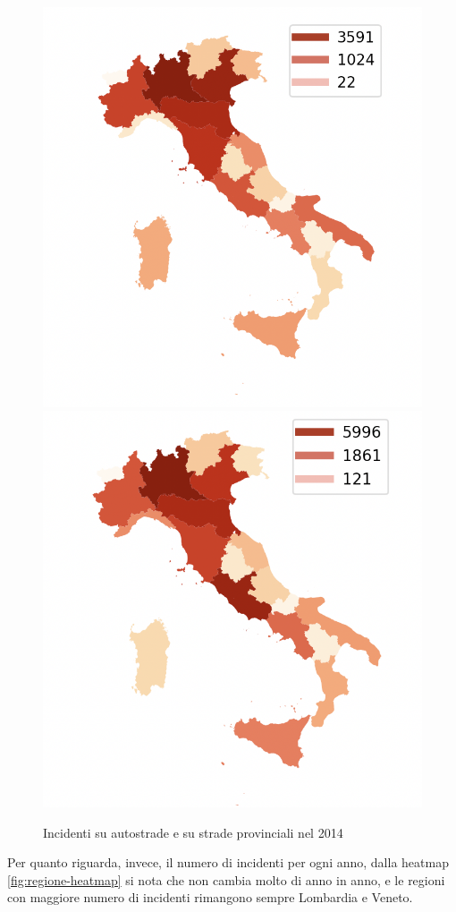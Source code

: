 \documentclass[a4paper]{report}
\begin{document}
\begin{figure}
    \includegraphics[width=0.5\linewidth]{../src/incidenti/incidenti_aci/mappe_regioni/incidenti_per_regione.png}
    \includegraphics[width=0.5\linewidth]{../src/incidenti/incidenti_aci/mappe_regioni/incidenti_regione_autostrade.png}
    \caption{Incidenti su autostrade e su strade provinciali nel 2014}
    \label{fig:incidenti-per-regione}
\end{figure}

Per quanto riguarda, invece, il numero di incidenti per ogni anno, 
dalla heatmap \ref{fig:regione-heatmap} 
si nota che non cambia molto di anno in anno, e le regioni con maggiore numero di incidenti rimangono 
sempre Lombardia e Veneto.
\end{document}
